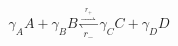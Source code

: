 \begin{equation}\label{eqn:reaction_s}
\gamma_A A + \gamma_B B \overset{\overset{r_+}{\rightharpoonup}}{\underset{r_-}{\leftharpoondown}} \gamma_C C + \gamma_D D
\end{equation}